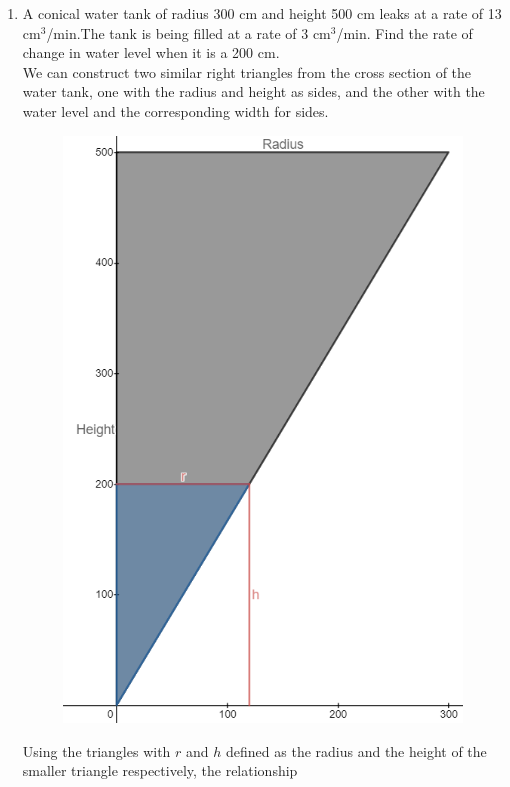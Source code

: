 \documentclass{article}
\begin{document}
\begin{enumerate}[label=\textbf{(10.\arabic*)}]

\item A conical water tank of radius 300 cm and height 500 cm leaks at a rate of 13 cm$^3$/min.The tank is being filled at a rate of 3 cm$^3$/min. Find the rate of change in water level when it is a 200 cm. \\
\newline
We can construct two similar right triangles from the cross section of the water tank, one with the radius and height as sides, and the other with the water level and the corresponding width for sides.
\begin{figure}[h]
\centering
\includegraphics[scale=.25]{graph4}
\end{figure}
\par
Using the triangles with $r$ and $h$ defined as the radius and the height of the smaller triangle respectively, the relationship

\end{enumerate}
\end{document}
